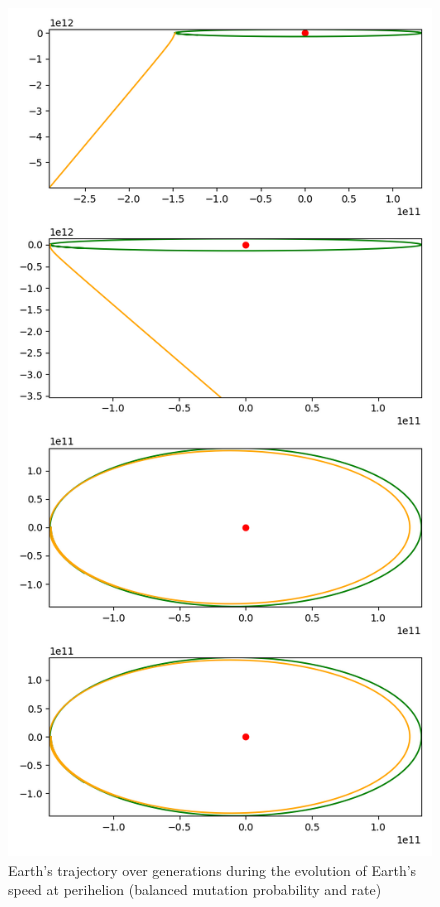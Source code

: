 \begin{figure}
    \center
    \includegraphics[scale=.3]{img/perihelion_speed_test_0.50_0.50_10_5.png}
    \caption{Earth's trajectory over generations during the evolution of
        Earth's speed at perihelion (balanced mutation probability and rate)}
    \label{speed_balanced}
\end{figure}


